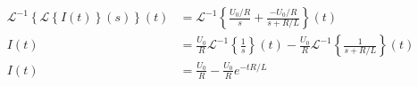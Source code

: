 \documentclass{article}
\newcommand{\Laplace}[1]{\mathcal{L}\left\{#1\right\}(s)}
\newcommand{\ILaplace}[1]{\mathcal{L}^{-1}\left\{#1\right\}(t)}
\begin{document}
\begin{align*}
\ILaplace{\Laplace{I(t)}}  & = \ILaplace{\frac{U_0/R}{s} + \frac{-U_0/R}{s+R/L}} \\
I(t)  & = \frac{U_0}{R}\ILaplace{\frac{1}{s}} - \frac{U_0}{R}\ILaplace{\frac{1}{s+R/L}}\\
I(t) & = \frac{U_0}{R} - \frac{U_0}{R}e^{-t R/L}
\end{align*}
\end{document}
